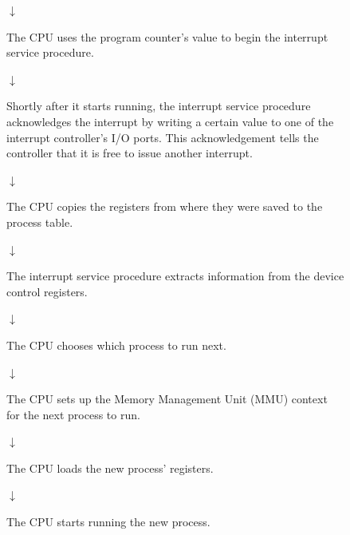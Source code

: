 \documentclass[a4paper]{systems-software}
\begin{document}
\begin{figure}[H]
{\begin{minipage}{\dimexpr \textwidth-2\fboxsep-2\fboxrule}
    \begin{center}
    	$\downarrow$
    \end{center}
    
    The CPU uses the program counter's value to begin the interrupt service procedure.
    
    \begin{center}
    	$\downarrow$
    \end{center}
    
    Shortly after it starts running, the interrupt service procedure acknowledges the interrupt by writing a certain value to one of the interrupt controller’s I/O ports. This acknowledgement tells the controller that it is free to issue another interrupt.
	
	\begin{center}
		$\downarrow$
	\end{center}
	
	The CPU copies the registers from where they were saved to the process table.
	
	\begin{center}
		$\downarrow$
	\end{center}
	
	The interrupt service procedure extracts information from the device control registers.
	
	\begin{center}
		$\downarrow$
	\end{center}
	
	The CPU chooses which process to run next.
	
	\begin{center}
		$\downarrow$
	\end{center}
	
	The CPU sets up the Memory Management Unit (MMU) context for the next process to run.
	
	\begin{center}
		$\downarrow$
	\end{center}
	
	The CPU loads the new process' registers.
	
	\begin{center}
		$\downarrow$
	\end{center}
	
	The CPU starts running the new process.
  \end{minipage}}
\end{figure}
\end{document}

